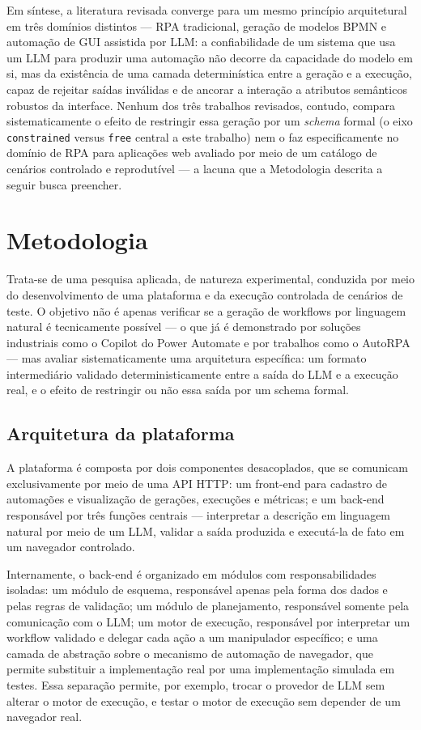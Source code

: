\documentclass[
	article,
	12pt,
	oneside,
	a4paper,
	section=TITLE,
	english,
	brazil,
	sumario=tradicional
	]{abntex2}
\begin{document}
Em síntese, a literatura revisada converge para um mesmo princípio
arquitetural em três domínios distintos --- RPA tradicional, geração de
modelos BPMN e automação de GUI assistida por LLM: a confiabilidade de um
sistema que usa um LLM para produzir uma automação não decorre da
capacidade do modelo em si, mas da existência de uma camada determinística
entre a geração e a execução, capaz de rejeitar saídas inválidas e de
ancorar a interação a atributos semânticos robustos da interface. Nenhum
dos três trabalhos revisados, contudo, compara sistematicamente o efeito
de restringir essa geração por um \textit{schema} formal (o eixo
\texttt{constrained} versus \texttt{free} central a este trabalho) nem o
faz especificamente no domínio de RPA para aplicações web avaliado por
meio de um catálogo de cenários controlado e reprodutível --- a lacuna
que a Metodologia descrita a seguir busca preencher.

\section{Metodologia}

Trata-se de uma pesquisa aplicada, de natureza experimental, conduzida por
meio do desenvolvimento de uma plataforma e da execução controlada de
cenários de teste. O objetivo não é apenas verificar se a geração de
workflows por linguagem natural é tecnicamente possível --- o que já é
demonstrado por soluções industriais como o Copilot do Power Automate e
por trabalhos como o AutoRPA \cite{microsoftcopilot2026, chen2026} --- mas
avaliar sistematicamente uma arquitetura específica: um formato
intermediário validado deterministicamente entre a saída do LLM e a
execução real, e o efeito de restringir ou não essa saída por um schema
formal.

\subsection{Arquitetura da plataforma}

A plataforma é composta por dois componentes desacoplados, que se
comunicam exclusivamente por meio de uma API HTTP: um front-end para
cadastro de automações e visualização de gerações, execuções e métricas; e
um back-end responsável por três funções centrais --- interpretar a
descrição em linguagem natural por meio de um LLM, validar a saída
produzida e executá-la de fato em um navegador controlado.

Internamente, o back-end é organizado em módulos com responsabilidades
isoladas: um módulo de esquema, responsável apenas pela forma dos dados e
pelas regras de validação; um módulo de planejamento, responsável somente
pela comunicação com o LLM; um motor de execução, responsável por
interpretar um workflow validado e delegar cada ação a um manipulador
específico; e uma camada de abstração sobre o mecanismo de automação de
navegador, que permite substituir a implementação real por uma
implementação simulada em testes. Essa separação permite, por exemplo,
trocar o provedor de LLM sem alterar o motor de execução, e testar o motor
de execução sem depender de um navegador real.
\end{document}
